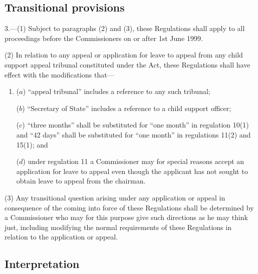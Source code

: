 \documentclass[12pt,a4paper]{article}
\begin{document}
\subsection[3. Transitional provisions]{Transitional provisions}

3.—(1) Subject to paragraphs (2) and (3), these Regulations shall apply to all proceedings before the Commissioners on or after 1st June 1999.

(2) In relation to any appeal or application for leave to appeal from any child support appeal tribunal constituted under the Act, these Regulations shall have effect with the modifications that---
\begin{enumerate}\item[]
($a$) “appeal tribunal” includes a reference to any such tribunal;

($b$) “Secretary of State” includes a reference to a child support officer;

($c$) “three months” shall be substituted for “one month” in regulation 10(1) and “42 days” shall be substituted for “one month” in regulations 11(2) and 15(1); and

($d$) under regulation 11 a Commissioner may for special reasons accept an application for leave to appeal even though the applicant has not sought to obtain leave to appeal from the chairman.
\end{enumerate}

(3) Any transitional question arising under any application or appeal in consequence of the coming into force of these Regulations shall be determined by a Commissioner who may for this purpose give such directions as he may think just, including modifying the normal requirements of these Regulations in relation to the application or appeal.

\subsection[4. Interpretation]{Interpretation}
\end{document}
